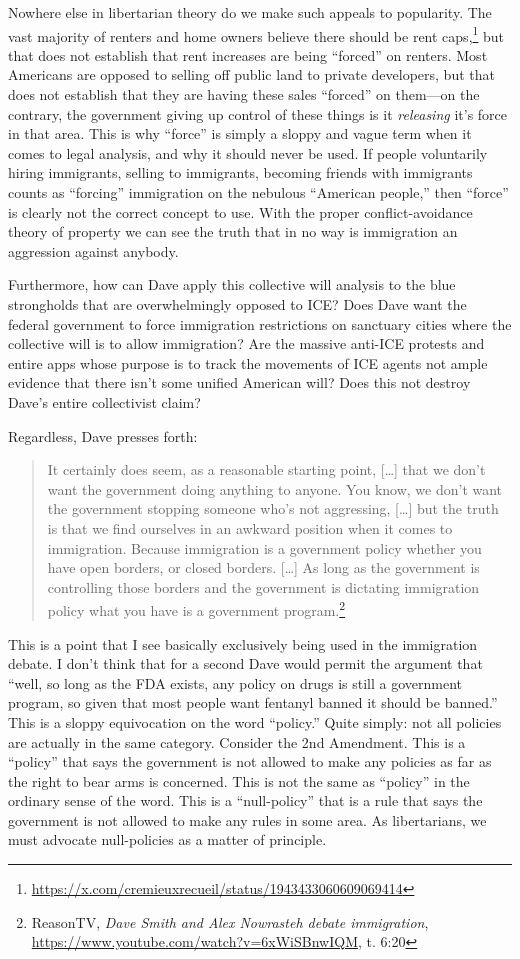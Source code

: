\documentclass[11pt]{article}
\begin{document}
Nowhere else in libertarian theory do we make such appeals to popularity. The vast majority of renters and home owners believe there should be rent caps,\footnote{\url{https://x.com/cremieuxrecueil/status/1943433060609069414}} but that does not establish that rent increases are being ``forced'' on renters. Most Americans are opposed to selling off public land to private developers, but that does not establish that they are having these sales ``forced'' on them---on the contrary, the government giving up control of these things is it \emph{releasing} it's force in that area. This is why ``force'' is simply a sloppy and vague term when it comes to legal analysis, and why it should never be used. If people voluntarily hiring immigrants, selling to immigrants, becoming friends with immigrants counts as ``forcing'' immigration on the nebulous ``American people,'' then ``force'' is clearly not the correct concept to use. With the proper conflict-avoidance theory of property we can see the truth that in no way is immigration an aggression against anybody.

Furthermore, how can Dave apply this collective will analysis to the blue strongholds that are overwhelmingly opposed to ICE? Does Dave want the federal government to force immigration restrictions on sanctuary cities where the collective will is to allow immigration? Are the massive anti-ICE protests and entire apps whose purpose is to track the movements of ICE agents not ample evidence that there isn't some unified American will? Does this not destroy Dave's entire collectivist claim?

Regardless, Dave presses forth:
\begin{quote}
It certainly does seem, as a reasonable starting point, [\ldots{}] that we don't want the government doing anything to anyone. You know, we don't want the government stopping someone who's not aggressing, [\ldots{}] but the truth is that we find ourselves in an awkward position when it comes to immigration. Because immigration is a government policy whether you have open borders, or closed borders. [\ldots{}] As long as the government is controlling those borders and the government is dictating immigration policy what you have is a government program.\footnote{ReasonTV, \emph{Dave Smith and Alex Nowrasteh debate immigration}, \url{https://www.youtube.com/watch?v=6xWiSBnwIQM}, t. 6:20}
\end{quote}

This is a point that I see basically exclusively being used in the immigration debate. I don't think that for a second Dave would permit the argument that ``well, so long as the FDA exists, any policy on drugs is still a government program, so given that most people want fentanyl banned it should be banned.'' This is a sloppy equivocation on the word ``policy.'' Quite simply: not all policies are actually in the same category. Consider the 2nd Amendment. This is a ``policy'' that says the government is not allowed to make any policies as far as the right to bear arms is concerned. This is not the same as ``policy'' in the ordinary sense of the word. This is a ``null-policy'' that is a rule that says the government is not allowed to make any rules in some area. As libertarians, we must advocate null-policies as a matter of principle.
\end{document}
